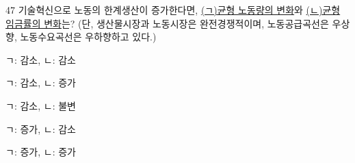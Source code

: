 \begin{question}{47}
기술혁신으로 노동의 한계생산이 증가한다면, \uline{(ㄱ)균형 노동량의 변화}와 \uline{(ㄴ)균형 임금률의 변화}는? (단, 생산물시장과 노동시장은 완전경쟁적이며, 노동공급곡선은 우상향, 노동수요곡선은 우하향하고 있다.)
\begin{choices}
  \item ㄱ: 감소, ㄴ: 감소
  \item ㄱ: 감소, ㄴ: 증가
  \item ㄱ: 감소, ㄴ: 불변
  \item ㄱ: 증가, ㄴ: 감소
  \item ㄱ: 증가, ㄴ: 증가
\end{choices}
\end{question}
